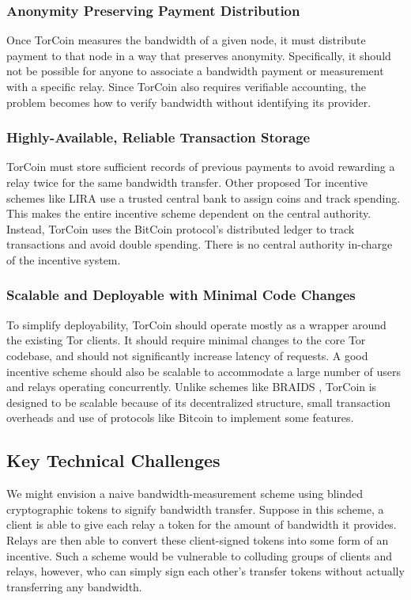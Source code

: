 \subsubsection{Anonymity Preserving Payment Distribution} Once TorCoin measures
the bandwidth of a given node, it must distribute payment to that node in a way
that preserves anonymity. Specifically, it should not be possible for anyone to
associate a bandwidth payment or measurement with a specific relay. Since
TorCoin also requires verifiable accounting, the problem becomes how to verify
bandwidth without identifying its provider.

\subsubsection{Highly-Available, Reliable Transaction Storage} TorCoin must
store sufficient records of previous payments to avoid rewarding a relay twice
for the same bandwidth transfer. Other proposed Tor incentive schemes like
LIRA\cite{jansen2013lira} use a trusted central bank to assign coins and track
spending. This makes the entire incentive scheme dependent on the central
authority. Instead, TorCoin uses the BitCoin protocol's distributed ledger to
track transactions and avoid double spending\cite{karame2012two}. There is no
central authority in-charge of the incentive system.

\subsubsection{Scalable and Deployable with Minimal Code Changes} To simplify
deployability, TorCoin should operate mostly as a wrapper around the existing
Tor clients. It should require minimal changes to the core Tor codebase, and
should not significantly increase latency of requests. A good incentive scheme
should also be scalable to accommodate a large number of users and relays
operating concurrently. Unlike schemes like BRAIDS \cite{ccs10-braids}, TorCoin
is designed to be scalable because of its decentralized structure, small
transaction overheads and use of protocols like Bitcoin to implement some
features.

\subsection{Key Technical Challenges}

We might envision a naive bandwidth-measurement scheme using blinded
cryptographic tokens to signify bandwidth transfer. Suppose in this scheme, a
client is able to give each relay a token for the amount of bandwidth it
provides. Relays are then able to convert these client-signed tokens into some
form of an incentive.  Such a scheme would be vulnerable to colluding groups of
clients and relays, however, who can simply sign each other's transfer tokens
without actually transferring any bandwidth.


